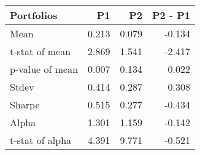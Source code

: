 \begin{tabular}{lrrr}
\toprule
Portfolios & P1 & P2 & P2 - P1 \\
\midrule
Mean & 0.213 & 0.079 & -0.134 \\
t-stat of mean & 2.869 & 1.541 & -2.417 \\
p-value of mean & 0.007 & 0.134 & 0.022 \\
Stdev & 0.414 & 0.287 & 0.308 \\
Sharpe & 0.515 & 0.277 & -0.434 \\
Alpha & 1.301 & 1.159 & -0.142 \\
t-stat of alpha & 4.391 & 9.771 & -0.521 \\
\bottomrule
\end{tabular}

